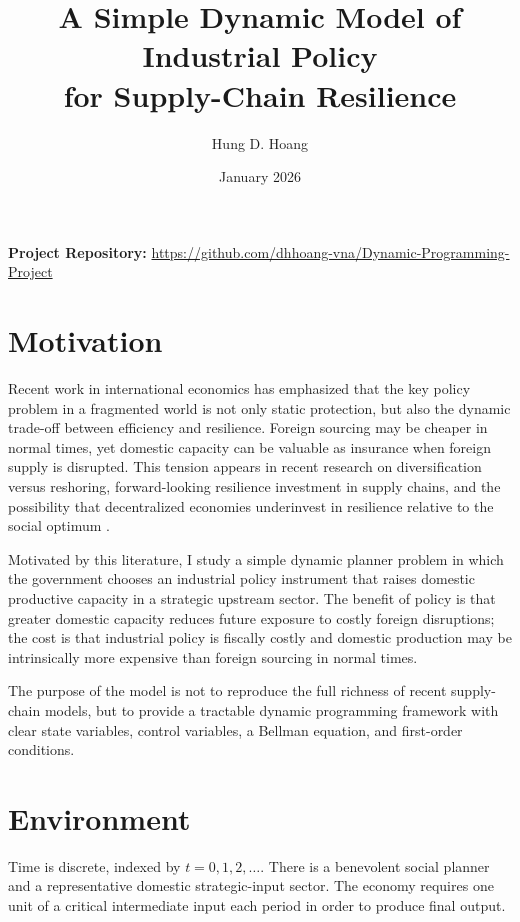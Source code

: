 \documentclass[11pt]{article}
\title{A Simple Dynamic Model of Industrial Policy \\ for Supply-Chain Resilience}
\author{Hung D. Hoang}
\date{January 2026}
\begin{document}
\maketitle

\begin{center}
\textbf{Project Repository:} \url{https://github.com/dhhoang-vna/Dynamic-Programming-Project}
\end{center}

\section{Motivation}

Recent work in international economics has emphasized that the key policy problem in a fragmented world is not only static protection, but also the dynamic trade-off between efficiency and resilience. Foreign sourcing may be cheaper in normal times, yet domestic capacity can be valuable as insurance when foreign supply is disrupted. This tension appears in recent research on diversification versus reshoring, forward-looking resilience investment in supply chains, and the possibility that decentralized economies underinvest in resilience relative to the social optimum \citep{GHL2023,GHS2024,CDS2024}.

Motivated by this literature, I study a simple dynamic planner problem in which the government chooses an industrial policy instrument that raises domestic productive capacity in a strategic upstream sector. The benefit of policy is that greater domestic capacity reduces future exposure to costly foreign disruptions; the cost is that industrial policy is fiscally costly and domestic production may be intrinsically more expensive than foreign sourcing in normal times.

The purpose of the model is not to reproduce the full richness of recent supply-chain models, but to provide a tractable dynamic programming framework with clear state variables, control variables, a Bellman equation, and first-order conditions.

\section{Environment}

Time is discrete, indexed by $t=0,1,2,\dots$. There is a benevolent social planner and a representative domestic strategic-input sector. The economy requires one unit of a critical intermediate input each period in order to produce final output.
\end{document}

